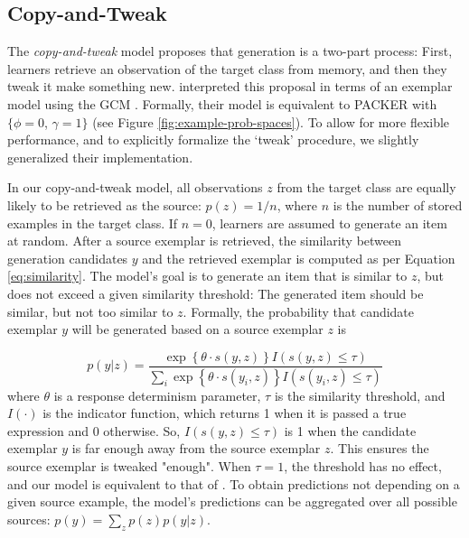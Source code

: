 \documentclass[10pt,letterpaper]{article}
\begin{document}
\subsection{Copy-and-Tweak}
The \textit{copy-and-tweak} model proposes that generation is a two-part process: First, learners retrieve an observation of the target class from memory, and then they tweak it make something new. \citet{jern2013probabilistic} interpreted this proposal in terms of an exemplar model using the GCM \citep{nosofsky1984choice}. Formally, their model is equivalent to PACKER with $\{\phi = 0$, $\gamma = 1\}$ (see Figure \ref{fig:example-prob-spaces}). To allow for more flexible performance, and to explicitly formalize the `tweak' procedure, we slightly generalized their implementation.

In our copy-and-tweak model, all observations $z$ from the target class are equally likely to be retrieved as the source: $p(z) = 1 / n$, where $n$ is the number of stored examples in the target class. If $n=0$, learners are assumed to generate an item at random. After a source exemplar is retrieved, the similarity between generation candidates $y$ and the retrieved exemplar is computed as per Equation \ref{eq:similarity}. The model's goal is to generate an item that is similar to $z$, but does not exceed a given similarity threshold: The generated item should be similar, but not too similar to $z$. Formally, the probability that candidate exemplar $y$ will be generated based on a source exemplar $z$ is 

\begin{equation}
    p(y|z)  = \dfrac
    { \exp \left\{\theta \cdot s(y,z) \right\} I\left(s(y,z) \leq \tau\right) }
    {\sum_i{\exp \left\{ \theta \cdot s(y_i,z) \right\} I\left(s(y_i,z) \leq \tau\right)}} 
\end{equation}
% 
where $\theta$ is a response determinism parameter, $\tau$ is the similarity threshold, and $I(\cdot)$ is the indicator function, which returns 1 when it is passed a true expression and 0 otherwise. So, $I\left(s(y,z) \leq \tau\right)$ is 1 when the candidate exemplar $y$ is far enough away from the source exemplar $z$. This ensures the source exemplar is tweaked "enough". When $\tau=1$, the threshold has no effect, and our model is equivalent to that of \citet{jern2013probabilistic}. To obtain predictions not depending on a given source example, the model's predictions can be aggregated over all possible sources: $p(y) = \sum_z{p(z)p(y|z)}$.
\end{document}
